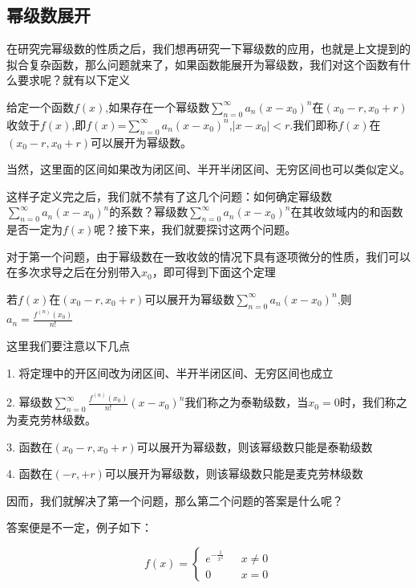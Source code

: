 \documentclass[lang=cn,10pt]{elegantbook}
\begin{document}
\subsection{幂级数展开}

在研究完幂级数的性质之后，我们想再研究一下幂级数的应用，也就是上文提到的拟合复杂函数，那么问题就来了，如果函数能展开为幂级数，我们对这个函数有什么要求呢？就有以下定义

\begin{definition}
	给定一个函数$f(x)$,如果存在一个幂级数$\sum_{n=0}^{\infty } a_{n} (x-x_{0} )^{n} $在$(x_{0}-r,x_{0}+r)$收敛于$f(x)$,即$f(x)$=$\sum_{n=0}^{\infty } a_{n} (x-x_{0} )^{n} $,$|x-x_{0}|<r$.我们即称$f(x)$在$(x_{0}-r,x_{0}+r)$可以展开为幂级数。
\end{definition}

当然，这里面的区间如果改为闭区间、半开半闭区间、无穷区间也可以类似定义。

这样子定义完之后，我们就不禁有了这几个问题：如何确定幂级数$\sum_{n=0}^{\infty } a_{n} (x-x_{0} )^{n} $的系数？幂级数$\sum_{n=0}^{\infty } a_{n} (x-x_{0} )^{n} $在其收敛域内的和函数是否一定为$f(x)$呢？接下来，我们就要探讨这两个问题。

对于第一个问题，由于幂级数在一致收敛的情况下具有逐项微分的性质，我们可以在多次求导之后在分别带入$x_{0}$，即可得到下面这个定理
\begin{theorem}
	若$f(x)$在$(x_{0}-r,x_{0}+r)$可以展开为幂级数$\sum_{n=0}^{\infty } a_{n} (x-x_{0} )^{n} $,则$a_{n}=\frac{{f}^{(n)}(x_{0} ) }{n!} $
\end{theorem}

这里我们要注意以下几点

1. 将定理中的开区间改为闭区间、半开半闭区间、无穷区间也成立

2. 幂级数$\sum_{n=0}^{\infty } \frac{{f}^{(n)}(x_{0} ) }{n!} (x-x_{0} )^{n} $我们称之为泰勒级数，当$x_{0}=0$时，我们称之为麦克劳林级数。

3. 函数在$(x_{0}-r,x_{0}+r)$可以展开为幂级数，则该幂级数只能是泰勒级数

4. 函数在$(-r,+r)$可以展开为幂级数，则该幂级数只能是麦克劳林级数

因而，我们就解决了第一个问题，那么第二个问题的答案是什么呢？

答案便是不一定，例子如下：
\begin{example}
	\begin{equation*}
		f(x)=\begin{cases}
			e^{-\frac{1}{x^{2} } }  & \text{ } x\ne 0 \\
			0& \text{ } x=0
		\end{cases}
	\end{equation*}
\end{example}
\end{document}
